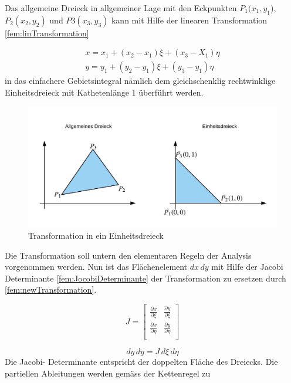 Das allgemeine Dreieck in allgemeiner Lage mit den Eckpunkten $P_1(x_1, y_1$), $ P_2(x_2, y_2)$ und $P3(x_3,y_3)$ kann mit Hilfe der linearen Transformation \ref{fem:linTransformation} 

\begin{equation}
			\begin{aligned}
			x = x_1 + (x_2 - x_1)\xi + (x_3 - X_1)\eta \\
			y = y_1 + (y_2 - y_1)\xi + (y_3 - y_1)\eta
			 \end{aligned}
			\label{fem:linTransformation}
\end{equation}
in das einfachere Gebietsintegral nämlich dem gleichschenklig rechtwinklige Einheitsdreieck mit Kathetenlänge 1 überführt werden.

\begin{figure}[h!]
	\centering
	\includegraphics[scale=0.6]{papers/fem/Images/Dreiecke.jpeg}
	\caption{Transformation in ein Einheitsdreieck}
	\label{fig:schemNMR_vorlage}
\end{figure}
Die Transformation soll untern den elementaren Regeln der Analysis vorgenommen werden. Nun ist das Flächenelement $dx \, dy$ mit Hilfe der Jacobi Determinante \ref{fem:JocobiDeterminante} der Transformation zu ersetzen durch \ref{fem:newTransformation}.

\begin{equation}
			J = \left[ \begin{array}{rr}
\frac{\partial x}{\partial \xi} & \frac{\partial y}{\partial \xi}  \\
\frac{\partial x}{\partial \eta} & \frac{\partial y}{\partial \eta}  \\
\end{array}\right] 
			\label{fem:JocobiDeterminante}
\end{equation}

\begin{equation}
			dy \, dy = J \, d\xi \, d\eta
			\label{fem:newTransformation}
\end{equation}
Die Jacobi- Determinante entspricht der doppelten Fläche des Dreiecks. Die partiellen Ableitungen werden gemäss der Kettenregel zu 

